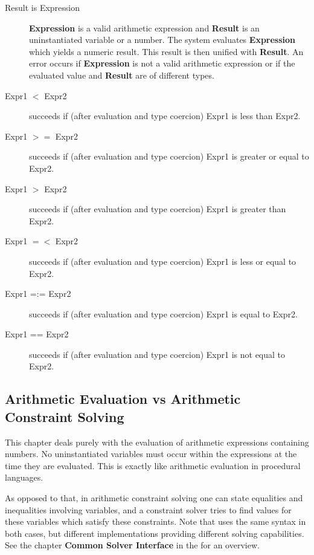 \begin{description}
\item[Result is Expression]
{\bf Expression} is a valid arithmetic expression and {\bf Result}
is an uninstantiated variable or a number.
The system evaluates {\bf Expression} which yields a numeric result.
This result is then unified with {\bf Result}.
An error occurs if {\bf Expression} is not a valid arithmetic expression or
if the evaluated value and {\bf Result} are of different types.
 
\item[Expr1 $<$ Expr2]
succeeds if (after evaluation and type coercion) Expr1 is less than Expr2.

\item[Expr1 $>=$ Expr2]
succeeds if (after evaluation and type coercion) Expr1 is greater or equal to Expr2.

\item[Expr1 $>$ Expr2]
succeeds if (after evaluation and type coercion) Expr1 is greater than Expr2.

\item[Expr1 $=<$ Expr2]
succeeds if (after evaluation and type coercion) Expr1 is less or equal to Expr2.

\item[Expr1 =:= Expr2]
succeeds if (after evaluation and type coercion) Expr1 is equal to Expr2.

\item[Expr1 =\bsl= Expr2]
succeeds if (after evaluation and type coercion) Expr1 is not equal to Expr2.
\end{description}


\subsection{Arithmetic Evaluation vs Arithmetic Constraint Solving}

This chapter deals purely with the evaluation of arithmetic expressions
containing numbers. No uninstantiated variables must occur within the
expressions at the time they are evaluated. This is exactly like
arithmetic evaluation in procedural languages.

As opposed to that, in arithmetic constraint solving one can state
equalities and inequalities involving variables, and a constraint
solver tries to find values for these variables which satisfy these
constraints. Note that {\eclipse} uses the same syntax in both cases,
but different implementations providing different solving capabilities.
See the chapter {\bf Common Solver Interface} in the
 for an overview.



